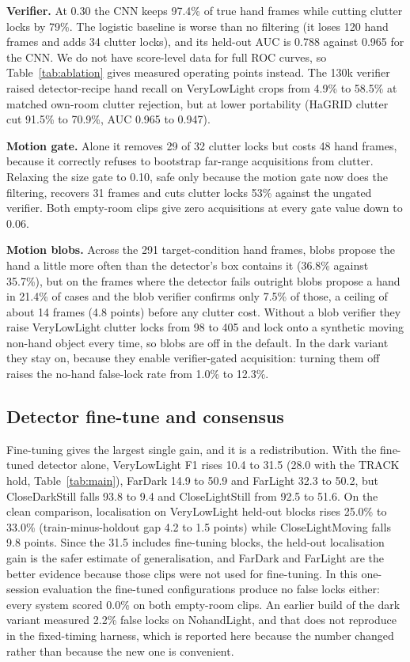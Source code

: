 \documentclass[conference,a4paper]{IEEEtran}
\begin{document}
\textbf{Verifier.} At 0.30 the CNN keeps 97.4\% of true hand frames while
cutting clutter locks by 79\%. The logistic baseline is worse than no
filtering (it loses 120 hand frames and adds 34 clutter locks), and its
held-out AUC is 0.788 against 0.965 for the CNN. We do not have score-level
data for full ROC curves, so Table~\ref{tab:ablation} gives measured
operating points instead. The 130k verifier raised detector-recipe hand
recall on VeryLowLight crops from 4.9\% to 58.5\% at matched own-room
clutter rejection, but at lower portability (HaGRID clutter cut 91.5\% to
70.9\%, AUC 0.965 to 0.947).

\textbf{Motion gate.} Alone it removes 29 of 32 clutter locks but costs 48
hand frames, because it correctly refuses to bootstrap far-range
acquisitions from clutter. Relaxing the size gate to 0.10, safe only
because the motion gate now does the filtering, recovers 31 frames and cuts
clutter locks 53\% against the ungated verifier. Both empty-room clips give
zero acquisitions at every gate value down to 0.06.

\textbf{Motion blobs.} Across the 291 target-condition hand frames, blobs
propose the hand a little more often than the detector's box contains it
(36.8\% against 35.7\%), but on the frames where the detector fails outright
blobs propose a hand in 21.4\% of cases and the blob verifier confirms only
7.5\% of those, a ceiling of about 14 frames (4.8 points) before any
clutter cost. Without a blob
verifier they raise VeryLowLight clutter locks from 98 to 405 and lock onto
a synthetic moving non-hand object every time, so blobs are off in the
default. In the dark variant they stay on, because they enable
verifier-gated acquisition: turning them off raises the no-hand false-lock
rate from 1.0\% to 12.3\%.

\subsection{Detector fine-tune and consensus}
Fine-tuning gives the largest single gain, and it is a redistribution. With
the fine-tuned detector alone, VeryLowLight F1 rises 10.4 to 31.5 (28.0
with the TRACK hold, Table~\ref{tab:main}), FarDark 14.9 to 50.9 and
FarLight 32.3 to 50.2, but CloseDarkStill falls 93.8 to 9.4 and
CloseLightStill from 92.5 to 51.6. On the clean comparison, localisation on
VeryLowLight held-out blocks rises 25.0\% to 33.0\% (train-minus-holdout
gap 4.2 to 1.5 points) while CloseLightMoving falls 9.8 points. Since the
31.5 includes fine-tuning blocks, the held-out localisation gain is the
safer estimate of generalisation, and FarDark and FarLight are the better
evidence because those clips were not used for fine-tuning. In this
one-session evaluation the fine-tuned configurations produce no false locks
either: every system scored 0.0\% on both empty-room clips. An earlier
build of the dark variant measured 2.2\% false locks on NohandLight, and
that does not reproduce in the fixed-timing harness, which is reported here
because the number changed rather than because the new one is convenient.
\end{document}
